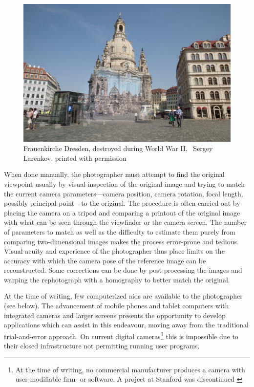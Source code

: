 \begin{figure}
   \includegraphics[width=\textwidth]{gfx/1950_2014_Frauenkirche_small.jpg}
   \caption{Frauenkirche Dresden, destroyed during World War II,
   \textcopyright\ Sergey Larenkov, printed with permission}
   \label{fig2}
\end{figure}

When done manually, the photographer must attempt to find the original viewpoint 
usually by visual inspection of the original image and trying to match the
current camera parameters---camera position, camera rotation, focal length,
possibly principal point---to the original.
The procedure is often carried out by placing the camera on a tripod and
comparing a printout of the original image with what can be seen through the
viewfinder or the camera screen. The number of parameters to match as well as
the difficulty to estimate them purely from comparing two-dimensional images makes the process
error-prone and tedious. Visual acuity and experience of the photographer thus
place limits on the accuracy with which the camera pose of the reference image
can be reconstructed. Some corrections can be done by post-processing the images
and warping the rephotograph with a homography to better match the original.

At the time of writing, few computerized aids are available to the photographer
(see below).  The advancement of mobile phones and tablet computers with
integrated cameras and larger screens presents the opportunity to develop
applications which can assist in this endeavour, moving away from the
traditional trial-and-error approach.  On current digital cameras\footnote{At
   the time of writing, no commercial manufacturer produces a camera with
   user-modifiable firm- or software. A project at Stanford \citep{Levoy2010}
was discontinued \cite{FrankenCam}} this is impossible due to their closed
infrastructure not permitting running user programs. 

